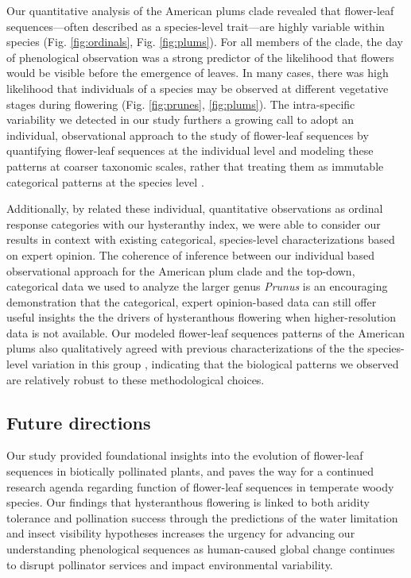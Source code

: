 \documentclass{article}[11pt]
\begin{document}
{Our quantitative analysis of the American plums clade revealed that flower-leaf sequences---often described as a species-level trait---are highly variable within species (Fig. \ref{fig:ordinals}, Fig. \ref{fig:plums}). For all members of the clade, the day of phenological observation was a strong predictor of the likelihood that flowers would be visible before the emergence of leaves. In many cases, there was high likelihood that individuals of a species may be observed at different vegetative stages during flowering (Fig. \ref{fig:prunes}, \ref{fig:plums}). The intra-specific variability we detected in our study furthers a growing call to adopt an individual, observational approach to the study of flower-leaf sequences by quantifying flower-leaf sequences at the individual level and modeling these patterns at coarser taxonomic scales, rather that treating them as immutable categorical patterns at the species level \citep{Buonaiuto2020}. 

Additionally, by related these individual, quantitative observations as ordinal response categories with our hysteranthy index, we were able to consider our results in context with existing categorical, species-level characterizations based on expert opinion. The coherence of inference between our individual based observational approach for the American plum clade and the top-down, categorical data we used to analyze the larger genus \emph{Prunus} is an encouraging demonstration that the categorical, expert opinion-based data can still offer useful insights the the drivers of hysteranthous flowering when higher-resolution data is not available. Our modeled flower-leaf sequences patterns of the American plums also qualitatively agreed with previous characterizations of the the species-level variation in this group \citep{Shaw:2004aa}, indicating that the biological patterns we observed are relatively robust to these methodological choices.

\subsection*{Future directions}
Our study provided foundational insights into the evolution of flower-leaf sequences in biotically pollinated plants, and paves the way for a continued research agenda regarding function of flower-leaf sequences in temperate woody species. Our findings that hysteranthous flowering is linked to both aridity tolerance and pollination success through the predictions of the water limitation and insect visibility hypotheses increases the urgency for advancing our understanding phenological sequences as human-caused global change continues to disrupt pollinator services and impact environmental variability. 

}
\end{document}
